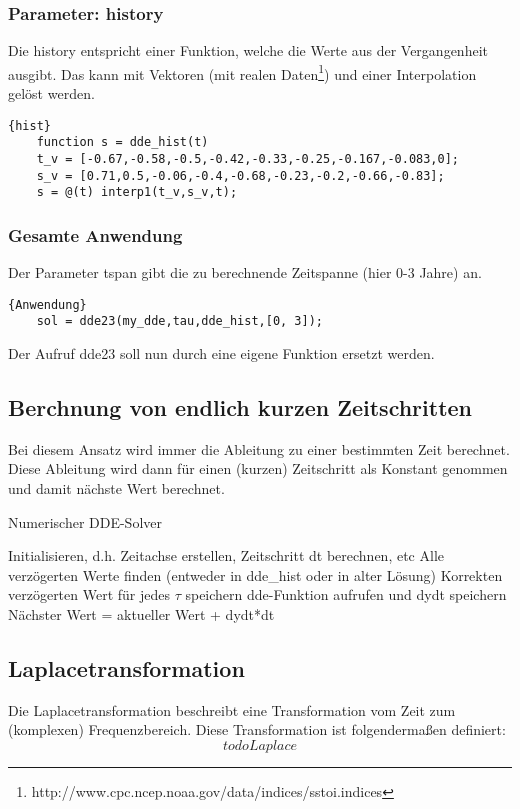 \subsubsection{Parameter: history}
Die history entspricht einer Funktion, welche die Werte aus der Vergangenheit ausgibt. 
Das kann mit Vektoren (mit realen Daten\footnote{http://www.cpc.ncep.noaa.gov/data/indices/sstoi.indices}) und einer Interpolation gelöst werden.
\begin{lstlisting}{hist}
	function s = dde_hist(t)
	t_v = [-0.67,-0.58,-0.5,-0.42,-0.33,-0.25,-0.167,-0.083,0];
	s_v = [0.71,0.5,-0.06,-0.4,-0.68,-0.23,-0.2,-0.66,-0.83];  
	s = @(t) interp1(t_v,s_v,t);
\end{lstlisting}

\subsubsection{Gesamte Anwendung}
Der Parameter tspan gibt die zu berechnende Zeitspanne (hier 0-3 Jahre) an.
\begin{lstlisting}{Anwendung}
	sol = dde23(my_dde,tau,dde_hist,[0, 3]);
\end{lstlisting}
Der Aufruf dde23 soll nun durch eine eigene Funktion ersetzt werden.
 

\subsection{Berchnung von endlich kurzen Zeitschritten}
Bei diesem Ansatz wird immer die Ableitung zu einer bestimmten Zeit berechnet.
Diese Ableitung wird dann für einen (kurzen) Zeitschritt als Konstant genommen und damit nächste Wert berechnet.
\begin{algorithm}
	\caption{Numerischer DDE-Solver}
	\label{algo1}
	\begin{algorithmic}[1]
		\State Initialisieren, d.h. Zeitachse erstellen, Zeitschritt dt berechnen, etc
		\State Alle verzögerten Werte finden (entweder in dde\_hist oder in alter Lösung)
		\State Korrekten verzögerten Wert für jedes $\tau$ speichern
		\EndFor
		\State dde-Funktion aufrufen und dydt speichern
		\State Nächster Wert = aktueller Wert + dydt*dt
		\EndFor
	\end{algorithmic}
\end{algorithm}

\subsection{Laplacetransformation}
Die Laplacetransformation beschreibt eine Transformation vom Zeit zum (komplexen) Frequenzbereich.
Diese Transformation ist folgendermaßen definiert:
\begin{equation}
	todo Laplace
\end{equation} 


